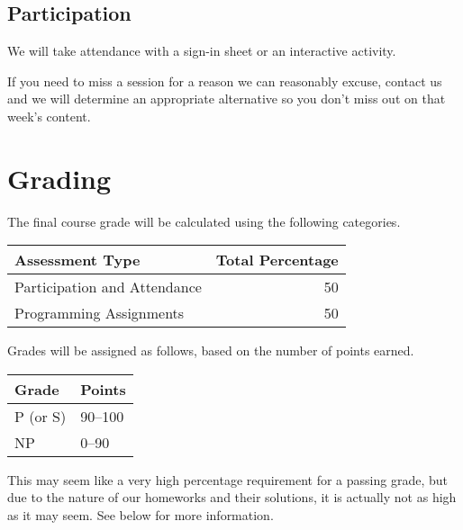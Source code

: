 \documentclass{article}
\begin{document}
\subsection*{Participation}

We will take attendance with a sign-in sheet or an interactive activity.

If you need to miss a session for a reason we can reasonably excuse, contact us
and we will determine an appropriate alternative so you don't miss out on that
week's content.


\section*{Grading}

The final course grade will be calculated using the following categories.

\begin{center}
    \begin{tabular}{@{}lr@{}}
        Assessment Type                 & Total Percentage \\ \toprule
        Participation and Attendance    &          50      \\
        Programming Assignments         &          50      \\ \bottomrule
    \end{tabular}
\end{center}

\vspace{1em}

Grades will be assigned as follows, based on the number of points earned.

\begin{center}
    \begin{tabular}{@{}ll@{}}
        Grade    & Points    \\ \toprule
        P (or S) & 90--100   \\
        NP       & 0--90     \\ \bottomrule
    \end{tabular}
\end{center}

\vspace{1em}

This may seem like a very high percentage requirement for a passing grade, but
due to the nature of our homeworks and their solutions, it is actually not as
high as it may seem. See below for more information.
\end{document}
